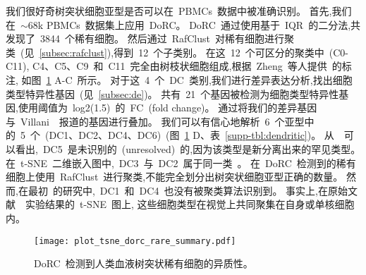 我们很好奇树突状细胞亚型是否可以在~PBMCs~数据中被准确识别。
首先,我们在~${\sim}68$k PBMCs~数据集上应用~DoRC。
DoRC~通过使用基于~IQR~的二分法,共发现了~3844~个稀有细胞。
然后通过~RafClust~对稀有细胞进行聚类~(见~\ref{subsec:rafclust}),得到~12~个子类别。
在这~12~个可区分的聚类中~(C0-C11),
C4、C5、C9~和~C11~完全由树枝状细胞组成,根据~Zheng~等人提供~\cite{zheng2017massively}的标注,
如图~\ref{fig:dorc_dendritic} A-C~所示。
对于这~4~个~DC~类别,我们进行差异表达分析,找出细胞类型特异性基因~(见~\ref{subsec:de})。
共有~21~个基因被检测为细胞类型特异性基因,使用阈值为~log2(1.5)~的~FC~(fold change)。
通过将我们的差异基因与~Villani~\cite{villani2017single}~报道的基因进行叠加。
我们可以有信心地解析~6~个亚型中的~5~个~(DC1、DC2、DC4、DC6)~(图~\ref{fig:dorc_dendritic} D、表~\ref{supp-tbl:dendritic})。
从~\cite{villani2017single}~可以看出,~DC5~是未识别的~(unresolved)~的,因为该类型是新分离出来的罕见类型。
在~t-SNE~二维嵌入图中,~DC3~与~DC2~属于同一类~\cite{maaten2008visualizing}。
在~DoRC~检测到的稀有细胞上使用~RafClust~进行聚类,不能完全划分出树突状细胞亚型正确的数量。
然而,在最初~\cite{zheng2017massively}的研究中,~DC1~和~DC4~也没有被聚类算法识别到。
事实上,在原始文献~\cite{zheng2017massively}~实验结果的~t-SNE~图上,
这些细胞类型在视觉上共同聚集在自身或单核细胞内。
\begin{figure}[!htbp]
    \centering
    \texttt{[image: plot\_tsne\_dorc\_rare\_summary.pdf]}
    \caption{
    DoRC~检测到人类血液树突状稀有细胞的异质性。
    }
    \label{fig:dorc_dendritic}
\end{figure}


